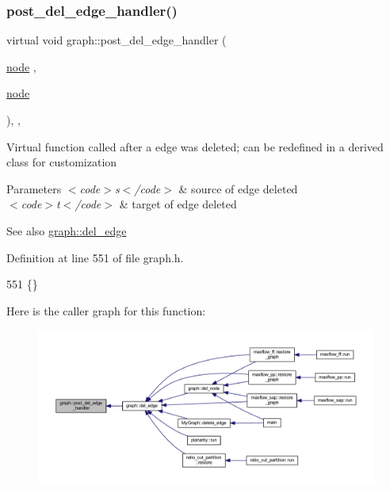 \subsubsection{\texorpdfstring{post\+\_\+del\+\_\+edge\+\_\+handler()}{post\_del\_edge\_handler()}}
{\footnotesize\ttfamily virtual void graph\+::post\+\_\+del\+\_\+edge\+\_\+handler (\begin{DoxyParamCaption}\item[{\mbox{\hyperlink{classnode}{node}}}]{,  }\item[{\mbox{\hyperlink{classnode}{node}}}]{ }\end{DoxyParamCaption})\hspace{0.3cm}{\ttfamily [inline]}, {\ttfamily [virtual]}, {\ttfamily [inherited]}}

Virtual function called after a edge was deleted; can be redefined in a derived class for customization


\begin{DoxyParams}{Parameters}
{\em $<$code$>$s$<$/code$>$} & source of edge deleted \\
\hline
{\em $<$code$>$t$<$/code$>$} & target of edge deleted \\
\hline
\end{DoxyParams}
\begin{DoxySeeAlso}{See also}
\mbox{\hyperlink{classgraph_ad9356508c49c542dfd4b7169297387c6}{graph\+::del\+\_\+edge}} 
\end{DoxySeeAlso}


Definition at line 551 of file graph.\+h.


\begin{DoxyCode}
551 \{\}
\end{DoxyCode}
Here is the caller graph for this function\+:
\nopagebreak
\begin{figure}[H]
\begin{center}
\leavevmode
\includegraphics[width=350pt]{classgraph_ab9ac8bcc7288986de69cd467beb33600_icgraph}
\end{center}
\end{figure}
\mbox{\label{classgraph_a4e08a559e3f1007a1a16a53c9a15cb0f}} 

